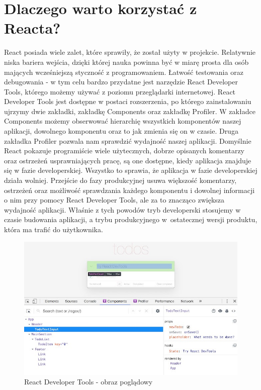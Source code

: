 \documentclass[oneside,polski,logo,indent]{amuthesis}
\begin{document}
\section{Dlaczego warto korzystać z Reacta?}{
React posiada wiele zalet, które sprawiły, że został użyty w projekcie. Relatywnie niska bariera wejścia, dzięki której nauka powinna być w miarę prosta dla osób mających wcześniejszą styczność z programowaniem. Łatwość testowania oraz debugowania - w tym celu bardzo przydatne jest narzędzie React Developer Tools, którego możemy używać z poziomu przeglądarki internetowej. React Developer Tools jest dostępne w postaci rozszerzenia, po którego zainstalowaniu ujrzymy dwie zakładki, zakładkę Components oraz zakładkę Profiler. W zakładce Components możemy obserwować hierarchię wszystkich komponentów naszej aplikacji, dowolnego komponentu oraz to jak zmienia się on w czasie. Druga zakładka Profiler pozwala nam sprawdzić wydajność naszej aplikacji. Domyślnie React pokazuje programiście wiele użytecznych, dobrze opisanych komentarzy oraz ostrzeżeń usprawniających pracę, są one dostępne, kiedy aplikacja znajduje się w fazie developerskiej. Wszystko to sprawia, że aplikacja w fazie developerskiej działa wolniej. Przejście do fazy produkcyjnej usuwa większość komentarzy, ostrzeżeń oraz możliwość sprawdzania każdego komponentu i dowolnej informacji o nim przy pomocy React Developer Tools, ale za to znacząco zwiększa wydajność aplikacji.
Właśnie z tych powodów tryb developerski stosujemy w czasie budowania aplikacji, a trybu produkcyjnego w~ostatecznej wersji produktu, która ma trafić do użytkownika.
\begin{figure}[H]
\centering
\includegraphics[width=13cm]{react dev example.jpg}
\caption{React Developer Tools - obraz poglądowy
\newline
}
\end{figure}}
\end{document}
